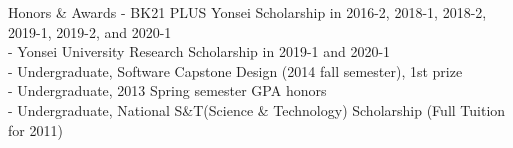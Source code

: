 \documentclass{resume} %
\begin{document}
	\begin{rSection}{Honors \& Awards}
		- BK21 PLUS Yonsei Scholarship in 2016-2, 2018-1, 2018-2, 2019-1, 2019-2, and 2020-1\\
		- Yonsei University Research Scholarship in 2019-1 and 2020-1\\
		- Undergraduate, Software Capstone Design (2014 fall semester), 1st prize\\
		- Undergraduate, 2013 Spring semester GPA honors\\
		- Undergraduate, National S\&T(Science \& Technology) Scholarship (Full Tuition for 2011)
	\end{rSection}
\end{document}
